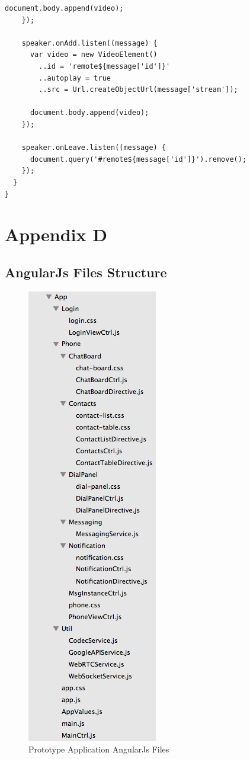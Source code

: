 \begin{appendices}
\begin{lstlisting}[caption={WebRTCCtrl in Dart application client},label={code:dart_webrtcctrl}]
      document.body.append(video);
    });

    speaker.onAdd.listen((message) {
      var video = new VideoElement()
        ..id = 'remote${message['id']}'
        ..autoplay = true
        ..src = Url.createObjectUrl(message['stream']);

      document.body.append(video);
    });

    speaker.onLeave.listen((message) {
      document.query('#remote${message['id']}').remove();
    });
  }
}
\end{lstlisting}

\chapter{Appendix D}

\section{AngularJs Files Structure}
\label{code:angularjs_structure}

\begin{figure}
	\centering
    	\includegraphics[height=0.45\textheight,natwidth=610,natheight=642]{figs/angularjs_structure.png}
  	\caption{Prototype Application AngularJs Files}
  	\label{fig:angularjs_structure}
\end{figure}

\end{appendices}
